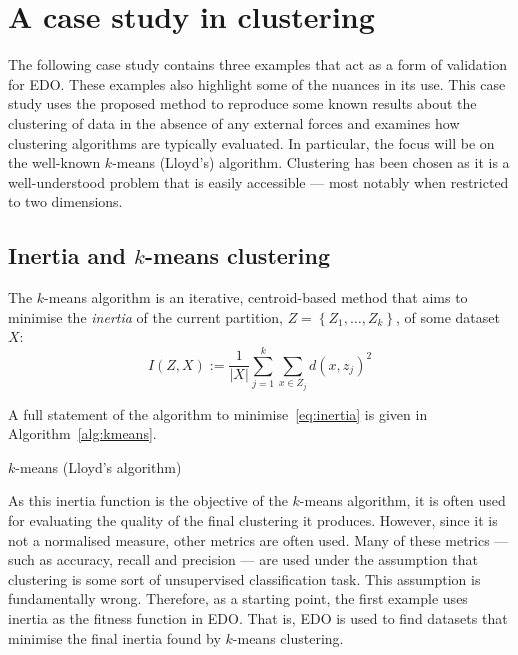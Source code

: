 \section{A case study in clustering}\label{sec:examples}

The following case study contains three examples that act as a form of
validation for EDO. These examples also highlight some of the nuances in its
use. This case study uses the proposed method to reproduce some known results
about the clustering of data in the absence of any external forces and examines
how clustering algorithms are typically evaluated. In particular, the focus will
be on the well-known \(k\)-means (Lloyd's) algorithm. Clustering has been chosen
as it is a well-understood problem that is easily accessible --- most notably
when restricted to two dimensions.

\subsection{Inertia and \(k\)-means clustering}\label{subsec:inertia}

The \(k\)-means algorithm is an iterative, centroid-based method that aims to
minimise the \emph{inertia} of the current partition, \(Z = \left\{Z_1, \ldots,
Z_k\right\}\), of some dataset \(X\):
\begin{equation}
    I(Z, X) := \frac{1}{|X|} \sum_{j=1}^{k} \sum_{x \in Z_j} {d(x, z_j)}^2
    \label{eq:inertia}
\end{equation}

A full statement of the algorithm to minimise~\eqref{eq:inertia} is given in
Algorithm~\ref{alg:kmeans}.

\balg%

\caption{\(k\)-means (Lloyd's algorithm)}\label{alg:kmeans}
\ealg%

As this inertia function is the objective of the \(k\)-means algorithm, it is
often used for evaluating the quality of the final clustering it produces.
However, since it is not a normalised measure, other metrics are often used.
Many of these metrics --- such as accuracy, recall and precision --- are used
under the assumption that clustering is some sort of unsupervised classification
task. This assumption is fundamentally wrong. Therefore, as a starting point,
the first example uses inertia as the fitness function in EDO. That is, EDO is
used to find datasets that minimise the final inertia found by \(k\)-means
clustering.

